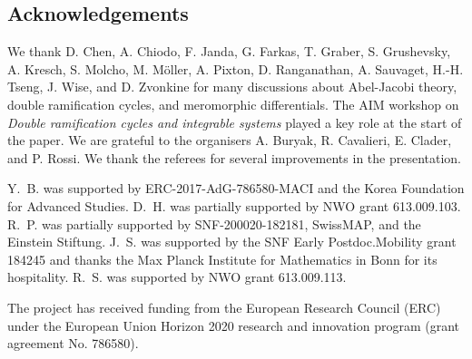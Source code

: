 \subsection{Acknowledgements}
We thank D. Chen, A. Chiodo, F. Janda, G. Farkas, T. Graber, S. Grushevsky, A. Kresch,
S. Molcho, M. M\"oller, A. Pixton, D. Ranganathan, A. Sauvaget, H.-H. Tseng,
J. Wise, and D. Zvonkine
for
many discussions about Abel-Jacobi theory, double ramification cycles,
and meromorphic differentials. The AIM workshop on {\em Double ramification cycles and integrable systems}
played a key role at the start of the paper. We are grateful to the organisers A. Buryak, R. Cavalieri, E. Clader, and P. Rossi. We thank the referees for several
improvements in the presentation.



Y.~B. was supported by ERC-2017-AdG-786580-MACI and the
Korea Foundation for Advanced Studies.
D.~H. was partially supported by NWO grant 613.009.103.
R.~P. was partially supported by
SNF-200020-182181, SwissMAP, and
the Einstein Stiftung.
J.~S. was supported by the SNF Early Postdoc.Mobility grant 184245 and thanks
the Max Planck Institute for Mathematics in Bonn for its hospitality.
R.~S. was supported by  NWO grant 613.009.113.


The project has received funding from the European Research
Council (ERC) under the European Union Horizon 2020 research and
innovation program (grant agreement No. 786580).
